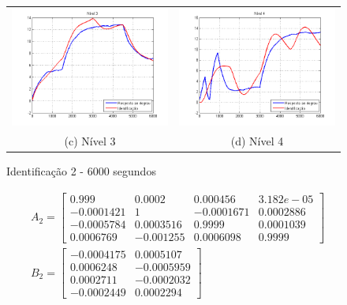 \begin{itemize}
\begin{figure}[H]
\begin{tabular}{cc}
		\includegraphics[height=0.15\paperheight,keepaspectratio]{img/ident2_h3.png} &
		\includegraphics[height=0.15\paperheight,keepaspectratio]{img/ident2_h4.png} \\
		(c) Nível 3 &
		(d) Nível 4
	\end{tabular}
	\caption{\label{imgID_45Results} Identificação 2 - 6000 segundos}
\end{figure}

\begin{align*}
	& A_2 =
	\begin{bmatrix}
		     0.999 &    0.0002 &   0.000456 &  3.182e-05 \\
		-0.0001421 &         1 & -0.0001671 &  0.0002886 \\
		-0.0005784 & 0.0003516 &     0.9999 &  0.0001039 \\
		 0.0006769 & -0.001255 &  0.0006098 &     0.9999
	\end{bmatrix}\\
	& B_2 =
	\begin{bmatrix}
		-0.0004175 &  0.0005107 \\
		 0.0006248 & -0.0005959 \\
		 0.0002711 & -0.0002032 \\
		-0.0002449 &  0.0002294
	\end{bmatrix}
\end{align*}


\end{itemize}
